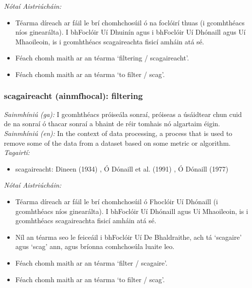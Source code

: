  \noindent \textit{Nótaí Aistriúcháin:}
\begin{itemize}
	\item Téarma díreach ar fáil le brí chomhchosúil ó na foclóirí thuas (i gcomhthéacs níos ginearálta). I bhFoclóir Uí Dhuinín agus i bhFoclóir Uí Dhónaill agus Uí Mhaoileoin, is i gcomhthéacs scagaireachta fisicí amháin atá sé.
	\item Féach chomh maith ar an téarma `filtering / scagaireacht'.
	\item Féach chomh maith ar an téarma `to filter / scag'.
\end{itemize}


\subsubsection*{scagaireacht (ainmfhocal): filtering}
 \noindent \textit{Sainmhíniú (ga):} I gcomhthéacs próiseála sonraí, próiseas a úsáidtear chun cuid de na sonraí ó thacar sonraí a bhaint de réir tomhais nó algartaim éigin.
\\
 \noindent \textit{Sainmhíniú (en):} In the context of data processing, a process that is used to remove some of the data from a dataset based on some metric or algorithm.
\\
 \noindent \textit{Tagairtí:}
\begin{itemize}
	\item scagaireacht: Dineen (1934) \cite{dineen}, Ó Dónaill et al. (1991) \cite{focloir-beag}, Ó Dónaill (1977) \cite{odonaill}
\end{itemize}

 \noindent \textit{Nótaí Aistriúcháin:}
\begin{itemize}
	\item Téarma díreach ar fáil le brí chomhchosúil ó Fhoclóir Uí Dhónaill (i gcomhthéacs níos ginearálta). I bhFoclóir Uí Dhónaill agus Uí Mhaoileoin, is i gcomhthéacs scagaireachta fisicí amháin atá sé.
	\item Níl an téarma seo le feiceáil i bhFoclóir Uí De Bhaldraithe, ach tá `scagaire' agus `scag' ann, agus bríonna comhchosúla luaite leo.
	\item Féach chomh maith ar an téarma `filter  / scagaire'.
	\item Féach chomh maith ar an téarma `to filter / scag'.
\end{itemize}


